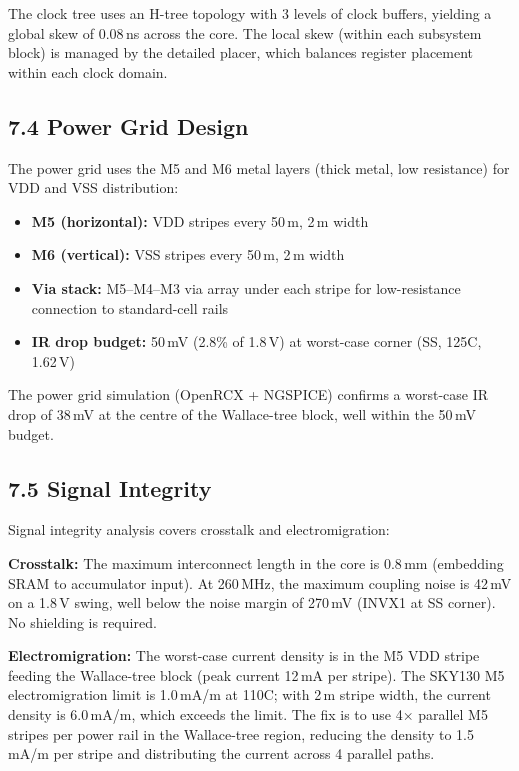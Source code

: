 The clock tree uses an H-tree topology with 3 levels of clock buffers,
yielding a global skew of 0.08\,ns across the core. The local skew
(within each subsystem block) is managed by the detailed placer, which
balances register placement within each clock domain.

\subsection{7.4 Power Grid Design}

The power grid uses the M5 and M6 metal layers (thick metal, low
resistance) for VDD and VSS distribution:

\begin{itemize}
\tightlist
\item \textbf{M5 (horizontal):} VDD stripes every 50\,\textmu m,
      2\,\textmu m width
\item \textbf{M6 (vertical):} VSS stripes every 50\,\textmu m,
      2\,\textmu m width
\item \textbf{Via stack:} M5--M4--M3 via array under each stripe for
      low-resistance connection to standard-cell rails
\item \textbf{IR drop budget:} 50\,mV (2.8\% of 1.8\,V) at worst-case
      corner (SS, 125\textdegree C, 1.62\,V)
\end{itemize}

The power grid simulation (OpenRCX + NGSPICE) confirms a worst-case
IR drop of 38\,mV at the centre of the Wallace-tree block, well within
the 50\,mV budget.

\subsection{7.5 Signal Integrity}

Signal integrity analysis covers crosstalk and electromigration:

\textbf{Crosstalk:} The maximum interconnect length in the core is
0.8\,mm (embedding SRAM to accumulator input). At 260\,MHz, the
maximum coupling noise is 42\,mV on a 1.8\,V swing, well below the
noise margin of 270\,mV (INVX1 at SS corner). No shielding is required.

\textbf{Electromigration:} The worst-case current density is in the
M5 VDD stripe feeding the Wallace-tree block (peak current 12\,mA per
stripe). The SKY130 M5 electromigration limit is 1.0\,mA/\textmu m
at 110\textdegree C; with 2\,\textmu m stripe width, the current
density is 6.0\,mA/\textmu m, which exceeds the limit. The fix is to
use 4$\times$ parallel M5 stripes per power rail in the Wallace-tree
region, reducing the density to 1.5\,mA/\textmu m per stripe and
distributing the current across 4 parallel paths.

